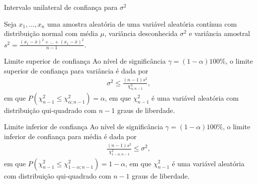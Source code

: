 \documentclass[8pt]{beamer}
\begin{document}
\begin{frame}{Intervalo unilateral de confiança para $\sigma^2$}

\small

Seja $x_1, \dots, x_n$ uma amostra aleatória de uma variável aleatória contínua com distribuição normal com média $\mu$, variância desconhecida $\sigma^2$ e variância amostral $s^2 = \frac{(x_1 - \bar{x})^2 + \dots + (x_1 - \bar{x})^2}{n-1}$. 

\begin{block}{Limite superior de confiança}
	Ao nível de significância $\gamma=(1-\alpha)100\%$, o limite superior de confiança para variância é dada por
	\begin{align*}
	\sigma^2 \leq \frac{(n-1)s^2}{\chi^2_{\alpha; n-1}},
	\end{align*}
	em que $P\left( \chi^2_{n-1} \leq \chi^2_{\alpha; n-1} \right) = \alpha$, em que $\chi^2_{n-1}$ é uma variável aleatória com distribuição qui-quadrado com $n-1$ graus de liberdade.
	
\end{block}

\begin{block}{Limite inferior de confiança}
	Ao nível de significância $\gamma=(1-\alpha)100\%$, o limite inferior de confiança para média é dada por
	\begin{align*}
		\frac{(n-1)s^2}{\chi^2_{1-\alpha; n-1}} \leq \sigma^2,
	\end{align*}
	em que $P\left( \chi^2_{n-1} \leq \chi^2_{1-\alpha; n-1} \right) = 1-\alpha$, em que $\chi^2_{n-1}$ é uma variável aleatória com distribuição qui-quadrado com $n-1$ graus de liberdade.
\end{block}

\normalsize

\end{frame}
\end{document}
